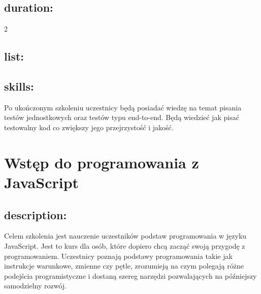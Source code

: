 \documentclass{article}[10pt]
\begin{document}
	\subsection*{duration:}
\begin{adjustwidth}{2cm}{}
	2
\end{adjustwidth}

	\subsection*{list:}
\begin{adjustwidth}{1.5cm}{}
	\begin{itemize}
































	\end{itemize}
\end{adjustwidth}

	\subsection*{skills:}
\begin{adjustwidth}{2cm}{}
	
Po ukończonym szkoleniu uczestnicy będą posiadać wiedzę na temat pisania testów jednostkowych oraz testów typu end-to-end. Będą wiedzieć jak pisać testowalny kod co zwiększy jego przejrzystość i jakość. 



\end{adjustwidth}

\newpage


    
	\section{Wstęp do programowania z JavaScript}

	\subsection*{description:}
	\begin{adjustwidth}{2cm}{}
		Celem szkolenia jest nauczenie uczestników podstaw programowania w języku JavaScript. Jest to kurs dla osób, które dopiero chcą zacząć swoją przygodę z programowaniem. Uczestnicy poznają podstawy programowania takie jak instrukcje warunkowe, zmienne czy pętle, zrozumieją na czym polegają różne podejścia programistyczne i dostaną szereg narzędzi pozwalających na późniejszy samodzielny rozwój.
	\end{adjustwidth}
\end{document}
